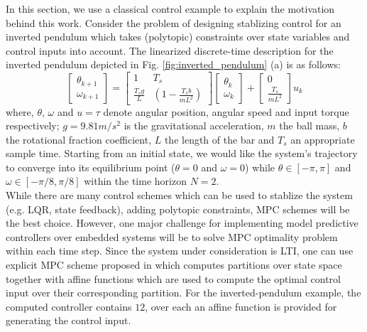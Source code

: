 In this section, we use a classical control example to explain the motivation behind this work. Consider the problem of designing stablizing control for an inverted pendulum which takes (polytopic) constraints over state variables and control inputs into account. The linearized discrete-time description for the inverted pendulum depicted in Fig. \ref{fig:inverted_pendulum} (a) is as follows:
	\begin{equation}
		\begin{bmatrix}
			 \theta_{k+1}\\
			\omega_{k+1}
		\end{bmatrix}=
		\begin{bmatrix}
			1 & T_s\\
			\frac{T_sg}{L}& (1-\frac{T_sb}{mL^2})		
		\end{bmatrix}
		\begin{bmatrix}
			\theta_k\\
			\omega_k
		\end{bmatrix}+
		\begin{bmatrix}
			0\\
			\frac{T_s}{mL^2}
		\end{bmatrix}u_k
		\label{eq:pendul_ss}
	\end{equation}
	where, $\theta$, $\omega$ and $u=\tau$ denote angular position, angular speed and input torque respectively; $g=9.81 m/s^2$ is the gravitational acceleration, $m$ the ball mass, $b$ the rotational fraction coefficient, $L$ the length of the bar and $T_s$ an appropriate sample time. Starting from an initial state, we would like the system's trajectory to converge into its equilibrium point ($\theta=0$ and $\omega=0$) while $\theta\in[-\pi,\pi]$ and $\omega\in[-\pi/8,\pi/8]$ within the time horizon $N=2$. \\
	While there are many control schemes which can be used to stablize the system (e.g. LQR, state feedback), adding polytopic constraints, MPC schemes will be the best choice. 
	However, one major challenge for implementing model predictive controllers over embedded systems will be to solve MPC optimality problem within each time step. Since the system under consideration is LTI, one can use explicit MPC scheme proposed in \cite{Bemporad:2002} which computes partitions over state space together with affine functions which are used to compute the optimal control input over their corresponding partition. For the inverted-pendulum example, the computed controller contains $12$, over each an affine function is provided for generating the control input.\\
